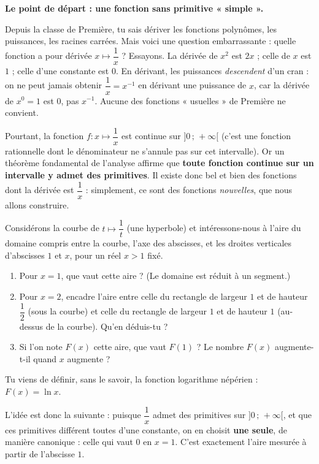\documentclass[11pt]{article}
\newcommand{\cle}[1]{{\popxbold\color{popdark}#1}}
\newcounter{popsec}
\newcounter{popsub}
\newcommand{\courssub}[1]{%
  \stepcounter{popsub}%
  \par\vspace{9pt}\noindent{\popxbold\fontsize{11.5}{13}\selectfont\color{popink}{\color{poporange}\thepopsec.\thepopsub}\hspace{6pt}#1}\par\nopagebreak\vspace{4pt}
}
\begin{document}
\courssub{Un problème d'aire sous l'hyperbole}

\textbf{Le point de départ : une fonction sans primitive « simple ».}\par

Depuis la classe de Première, tu sais dériver les fonctions polynômes, les puissances, les racines carrées. Mais voici une question embarrassante : quelle fonction a pour dérivée $x \mapsto \dfrac{1}{x}$ ? Essayons. La dérivée de $x^2$ est $2x$ ; celle de $x$ est $1$ ; celle d'une constante est $0$. En dérivant, les puissances \emph{descendent} d'un cran : on ne peut jamais obtenir $\dfrac{1}{x} = x^{-1}$ en dérivant une puissance de $x$, car la dérivée de $x^0 = 1$ est $0$, pas $x^{-1}$. Aucune des fonctions « usuelles » de Première ne convient.

Pourtant, la fonction $f : x \mapsto \dfrac{1}{x}$ est \cle{continue} sur $]0\,;\,+\infty[$ (c'est une fonction rationnelle dont le dénominateur ne s'annule pas sur cet intervalle). Or un théorème fondamental de l'analyse affirme que \textbf{toute fonction continue sur un intervalle y admet des primitives}. Il existe donc bel et bien des fonctions dont la dérivée est $\dfrac{1}{x}$ : simplement, ce sont des fonctions \emph{nouvelles}, que nous allons construire.

\begin{experience}
Considérons la courbe de $t \mapsto \dfrac{1}{t}$ (une hyperbole) et intéressons-nous à l'aire du domaine compris entre la courbe, l'axe des abscisses, et les droites verticales d'abscisses $1$ et $x$, pour un réel $x > 1$ fixé.
\begin{enumerate}
\item Pour $x = 1$, que vaut cette aire ? (Le domaine est réduit à un segment.)
\item Pour $x = 2$, encadre l'aire entre celle du rectangle de largeur $1$ et de hauteur $\dfrac{1}{2}$ (sous la courbe) et celle du rectangle de largeur $1$ et de hauteur $1$ (au-dessus de la courbe). Qu'en déduis-tu ?
\item Si l'on note $F(x)$ cette aire, que vaut $F(1)$ ? Le nombre $F(x)$ augmente-t-il quand $x$ augmente ?
\end{enumerate}
Tu viens de définir, sans le savoir, la fonction logarithme népérien : $F(x) = \ln x$.
\end{experience}

L'idée est donc la suivante : puisque $\dfrac{1}{x}$ admet des primitives sur $]0\,;\,+\infty[$, et que ces primitives différent toutes d'une constante, on en choisit \textbf{une seule}, de manière canonique : celle qui vaut $0$ en $x = 1$. C'est exactement l'aire mesurée à partir de l'abscisse $1$.
\end{document}
